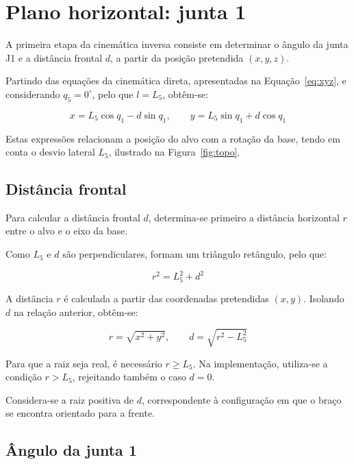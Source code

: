 
\section{Plano horizontal: junta 1}
\label{sec:ik_horizontal}

A primeira etapa da cinemática inversa consiste em determinar o ângulo da junta J1 e a distância frontal $d$, a partir da posição pretendida $(x,y,z)$.

Partindo das equações da cinemática direta, apresentadas na Equação~\eqref{eq:xyz}, e considerando $q_5=0^\circ$, pelo que $l=L_5$, obtêm-se:

\begin{equation}
    x=L_5\cos q_1-d\sin q_1,
    \qquad
    y=L_5\sin q_1+d\cos q_1
\end{equation}

Estas expressões relacionam a posição do alvo com a rotação da base, tendo em conta o desvio lateral $L_5$, ilustrado na Figura~\ref{fig:topo}.

\subsection{Distância frontal}

Para calcular a distância frontal $d$, determina-se primeiro a distância horizontal $r$ entre o alvo e o eixo da base.

Como $L_5$ e $d$ são perpendiculares, formam um triângulo retângulo, pelo que:

\begin{equation}
    r^2=L_5^2+d^2
\end{equation}

A distância $r$ é calculada a partir das coordenadas pretendidas $(x,y)$. Isolando $d$ na relação anterior, obtêm-se:

\begin{equation}
    \boxed{
    r=\sqrt{x^2+y^2},
    \qquad
    d=\sqrt{r^2-L_5^2}
    }
    \label{eq:ik_d}
\end{equation}

Para que a raiz seja real, é necessário $r\geq L_5$. Na implementação, utiliza-se a condição $r>L_5$, rejeitando também o caso $d=0$.

Considera-se a raiz positiva de $d$, correspondente à configuração em que o braço se encontra orientado para a frente.

\subsection{Ângulo da junta 1}

